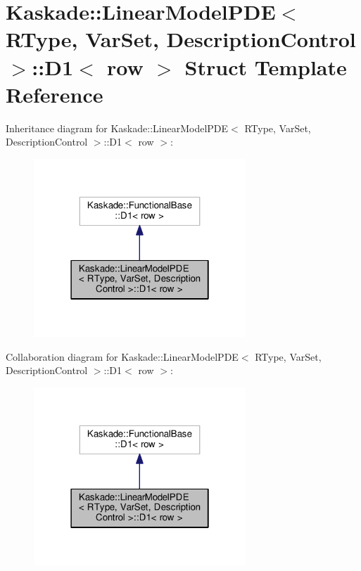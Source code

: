 \hypertarget{structKaskade_1_1LinearModelPDE_1_1D1}{\section{Kaskade\-:\-:Linear\-Model\-P\-D\-E$<$ R\-Type, Var\-Set, Description\-Control $>$\-:\-:D1$<$ row $>$ Struct Template Reference}
\label{structKaskade_1_1LinearModelPDE_1_1D1}
}


Inheritance diagram for Kaskade\-:\-:Linear\-Model\-P\-D\-E$<$ R\-Type, Var\-Set, Description\-Control $>$\-:\-:D1$<$ row $>$\-:
\nopagebreak
\begin{figure}[H]
\begin{center}
\leavevmode
\includegraphics[width=226pt]{structKaskade_1_1LinearModelPDE_1_1D1__inherit__graph}
\end{center}
\end{figure}


Collaboration diagram for Kaskade\-:\-:Linear\-Model\-P\-D\-E$<$ R\-Type, Var\-Set, Description\-Control $>$\-:\-:D1$<$ row $>$\-:
\nopagebreak
\begin{figure}[H]
\begin{center}
\leavevmode
\includegraphics[width=226pt]{structKaskade_1_1LinearModelPDE_1_1D1__coll__graph}
\end{center}
\end{figure}
